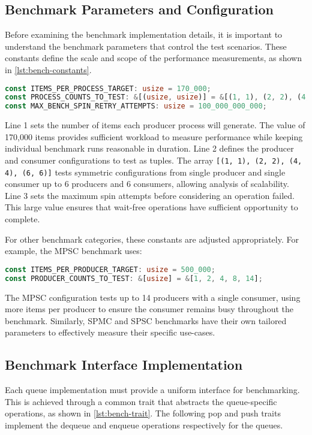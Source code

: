 \subsection{Benchmark Parameters and Configuration}
Before examining the benchmark implementation details, it is important to understand the benchmark parameters that control the test scenarios. These constants define the scale and scope of the performance measurements, as shown in \cref{lst:bench-constants}.

\begin{lstlisting}[language=Rust, style=boxed, caption={Benchmark configuration constants}, label={lst:bench-constants}]
const ITEMS_PER_PROCESS_TARGET: usize = 170_000;
const PROCESS_COUNTS_TO_TEST: &[(usize, usize)] = &[(1, 1), (2, 2), (4, 4), (6, 6)];
const MAX_BENCH_SPIN_RETRY_ATTEMPTS: usize = 100_000_000_000;
\end{lstlisting}

Line 1 sets the number of items each producer process will generate. The value of 170,000 items provides sufficient workload to measure performance while keeping individual benchmark runs reasonable in duration. Line 2 defines the producer and consumer configurations to test as tuples. The array \texttt{[(1, 1), (2, 2), (4, 4), (6, 6)]} tests symmetric configurations from single producer and single consumer up to 6 producers and 6 consumers, allowing analysis of scalability. Line 3 sets the maximum spin attempts before considering an operation failed. This large value ensures that wait-free operations have sufficient opportunity to complete.

For other benchmark categories, these constants are adjusted appropriately. For example, the \ac{MPSC} benchmark uses:

\begin{lstlisting}[language=Rust, style=boxed, caption={MPSC-specific configuration}, label={lst:mpsc-constants}]
const ITEMS_PER_PRODUCER_TARGET: usize = 500_000;
const PRODUCER_COUNTS_TO_TEST: &[usize] = &[1, 2, 4, 8, 14];
\end{lstlisting}

The \ac{MPSC} configuration tests up to 14 producers with a single consumer, using more items per producer to ensure the consumer remains busy throughout the benchmark. Similarly, \ac{SPMC} and \ac{SPSC} benchmarks have their own tailored parameters to effectively measure their specific use-cases.

\subsection{Benchmark Interface Implementation}
Each queue implementation must provide a uniform interface for benchmarking. This is achieved through a common trait that abstracts the queue-specific operations, as shown in \cref{lst:bench-trait}. The following pop and push traits implement the dequeue and enqueue operations respectively for the queues.

